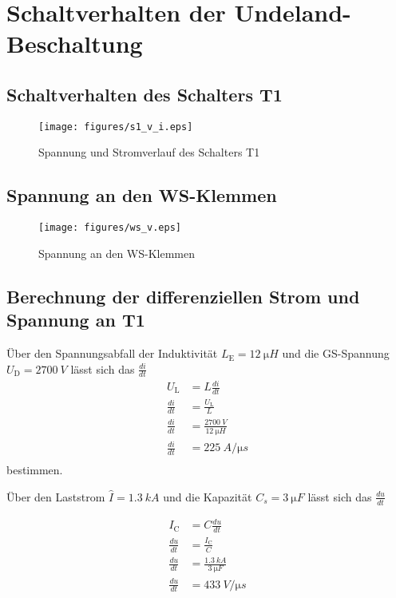 \section{Schaltverhalten der Undeland-Beschaltung}


\subsection{Schaltverhalten des Schalters T1}
\begin{figure}
\centering
\texttt{[image: figures/s1\_v\_i.eps]}
\caption{Spannung und Stromverlauf des Schalters T1}
\label{fig:s1_v_i}
\end{figure}

\subsection{Spannung an den WS-Klemmen}

\begin{figure}
\centering
\texttt{[image: figures/ws\_v.eps]}
\caption{Spannung an den WS-Klemmen}
\label{fig:ws_v}
\end{figure}

\subsection{Berechnung der differenziellen Strom und Spannung an T1}

Über den Spannungsabfall der Induktivität $L_\mathrm{E}=\qty[]{12}{\micro H}$ und die GS-Spannung $U_\mathrm{D}=\qty[]{2700}{V}$  lässt sich das $\frac{di}{dt}$
\begin{align}
    U_\mathrm{L}&=L\frac{di}{dt}\\
    \frac{di}{dt}&=\frac{U_\mathrm{L}}{L}\\ 
    \frac{di}{dt}&=\frac{\qty[]{2700}{V}}{\qty[]{12}{ \micro H}}\\ 
    \frac{di}{dt}&=\qty[]{225}{A/\micro s}\\
\end{align}
bestimmen.

Über den Laststrom $\hat I=\qty[]{1.3}{kA}$ und die Kapazität $C_s=\qty[]{3}{\micro F}$ lässt sich das $\frac{du}{dt}$

\begin{align}
    I_\mathrm{C}&=C\frac{du}{dt}\\
    \frac{du}{dt}&=\frac{I_\mathrm{C}}{C}\\ 
    \frac{du}{dt}&=\frac{\qty[]{1.3}{kA}}{\qty[]{3}{ \micro F}}\\ 
    \frac{du}{dt}&=\qty[]{433}{V/\micro s}\\
\end{align}

